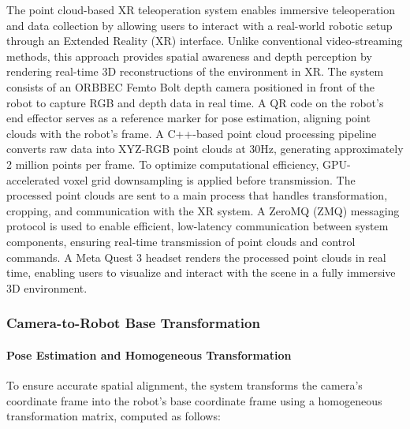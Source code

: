 
The point cloud-based XR teleoperation system enables immersive teleoperation and data collection by allowing users to interact with a real-world robotic setup through an Extended Reality (XR) interface. Unlike conventional video-streaming methods, this approach provides spatial awareness and depth perception by rendering real-time 3D reconstructions of the environment in XR. The system consists of an ORBBEC Femto Bolt depth camera positioned in front of the robot to capture RGB and depth data in real time. A QR code on the robot’s end effector serves as a reference marker for pose estimation, aligning point clouds with the robot’s frame. A C++-based point cloud processing pipeline converts raw data into XYZ-RGB point clouds at 30Hz, generating approximately 2 million points per frame. To optimize computational efficiency, GPU-accelerated voxel grid downsampling is applied before transmission. The processed point clouds are sent to a main process that handles transformation, cropping, and communication with the XR system. A ZeroMQ (ZMQ) messaging protocol is used to enable efficient, low-latency communication between system components, ensuring real-time transmission of point clouds and control commands. A Meta Quest 3 headset renders the processed point clouds in real time, enabling users to visualize and interact with the scene in a fully immersive 3D environment.

\subsubsection{Camera-to-Robot Base Transformation}

\paragraph{Pose Estimation and Homogeneous Transformation}
To ensure accurate spatial alignment, the system transforms the camera’s coordinate frame into the robot’s base coordinate frame using a homogeneous transformation matrix, computed as follows:

